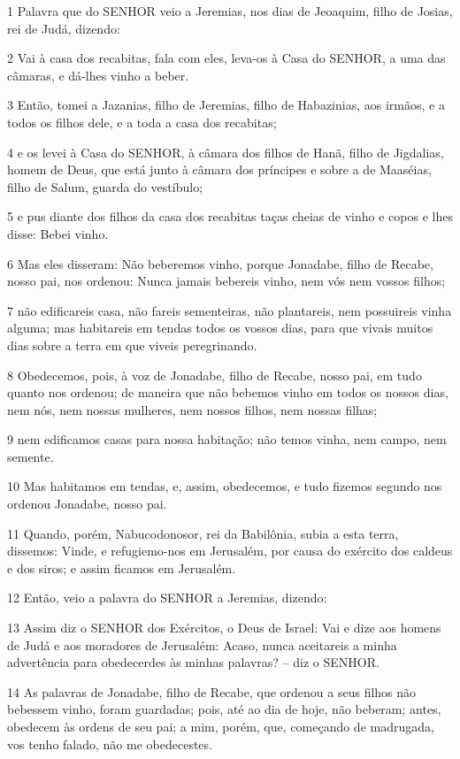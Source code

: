 \par 1 Palavra que do SENHOR veio a Jeremias, nos dias de Jeoaquim, filho de Josias, rei de Judá, dizendo:
\par 2 Vai à casa dos recabitas, fala com eles, leva-os à Casa do SENHOR, a uma das câmaras, e dá-lhes vinho a beber.
\par 3 Então, tomei a Jazanias, filho de Jeremias, filho de Habazinias, aos irmãos, e a todos os filhos dele, e a toda a casa dos recabitas;
\par 4 e os levei à Casa do SENHOR, à câmara dos filhos de Hanã, filho de Jigdalias, homem de Deus, que está junto à câmara dos príncipes e sobre a de Maaséias, filho de Salum, guarda do vestíbulo;
\par 5 e pus diante dos filhos da casa dos recabitas taças cheias de vinho e copos e lhes disse: Bebei vinho.
\par 6 Mas eles disseram: Não beberemos vinho, porque Jonadabe, filho de Recabe, nosso pai, nos ordenou: Nunca jamais bebereis vinho, nem vós nem vossos filhos;
\par 7 não edificareis casa, não fareis sementeiras, não plantareis, nem possuireis vinha alguma; mas habitareis em tendas todos os vossos dias, para que vivais muitos dias sobre a terra em que viveis peregrinando.
\par 8 Obedecemos, pois, à voz de Jonadabe, filho de Recabe, nosso pai, em tudo quanto nos ordenou; de maneira que não bebemos vinho em todos os nossos dias, nem nós, nem nossas mulheres, nem nossos filhos, nem nossas filhas;
\par 9 nem edificamos casas para nossa habitação; não temos vinha, nem campo, nem semente.
\par 10 Mas habitamos em tendas, e, assim, obedecemos, e tudo fizemos segundo nos ordenou Jonadabe, nosso pai.
\par 11 Quando, porém, Nabucodonosor, rei da Babilônia, subia a esta terra, dissemos: Vinde, e refugiemo-nos em Jerusalém, por causa do exército dos caldeus e dos siros; e assim ficamos em Jerusalém.
\par 12 Então, veio a palavra do SENHOR a Jeremias, dizendo:
\par 13 Assim diz o SENHOR dos Exércitos, o Deus de Israel: Vai e dize aos homens de Judá e aos moradores de Jerusalém: Acaso, nunca aceitareis a minha advertência para obedecerdes às minhas palavras? -- diz o SENHOR.
\par 14 As palavras de Jonadabe, filho de Recabe, que ordenou a seus filhos não bebessem vinho, foram guardadas; pois, até ao dia de hoje, não beberam; antes, obedecem às ordens de seu pai; a mim, porém, que, começando de madrugada, vos tenho falado, não me obedecestes.
